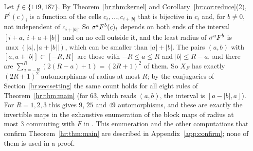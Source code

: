 \begin{remark}\label{hr:rem:census}
Let $f\in\{119,187\}$. By Theorem~\ref{hr:thm:kernel} and Corollary~\ref{hr:cor:reduce}(2), $F^b(c)_i$ is a function of the cells $c_i,\dots,c_{i+|b|}$ that is bijective in $c_i$ and, for $b\ne0$, not independent of $c_{i+|b|}$. So $\sigma^aF^b(c)_i$ depends on both ends of the interval $[i+a,\,i+a+|b|]$ and on no cell outside it, and the least radius of $\sigma^aF^b$ is $\max(|a|,|a+|b||)$, which can be smaller than $|a|+|b|$. The pairs $(a,b)$ with $[a,a+|b|]\subset[-R,R]$ are those with $-R\le a\le R$ and $|b|\le R-a$, and there are $\sum_{a=-R}^{R}(2(R-a)+1)=(2R+1)^2$ of them. So $X_F$ has exactly $(2R+1)^2$ automorphisms of radius at most $R$; by the conjugacies of Section~\ref{hr:sec:setting} the same count holds for all eight rules of Theorem~\ref{hr:thm:main} (for $63$, which reads $(a,b)$, the interval is $[a-|b|,a]$). For $R=1,2,3$ this gives $9$, $25$ and $49$ automorphisms, and these are exactly the invertible maps in the exhaustive enumeration of the block maps of radius at most $3$ commuting with $F$ in \cite{PaperD}. This enumeration and the other computations that confirm Theorem~\ref{hr:thm:main} are described in Appendix~\ref{app:confirm}; none of them is used in a proof.
\end{remark}
